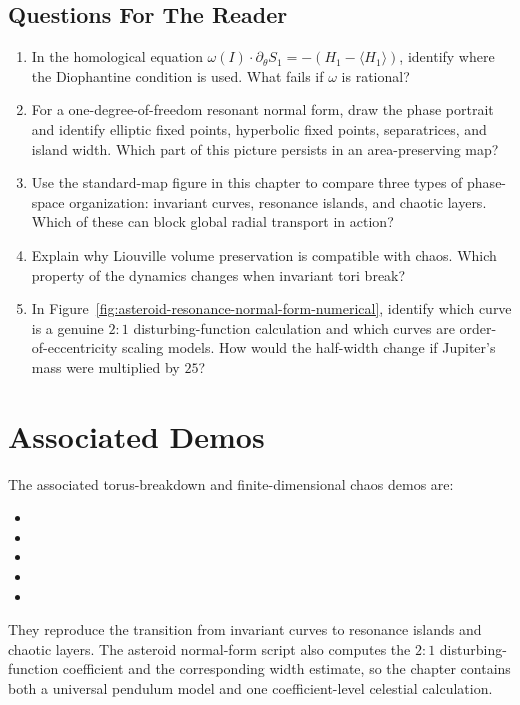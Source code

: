 \subsection{Questions For The Reader}
\label{sec:perturbation-chaos-questions}

\begin{enumerate}
\item In the homological equation
\(\omega(I)\cdot\partial_\theta S_1=-(H_1-\langle H_1\rangle)\), identify
where the Diophantine condition is used. What fails if \(\omega\) is
rational?
\item For a one-degree-of-freedom resonant normal form, draw the phase portrait
and identify elliptic fixed points, hyperbolic fixed points, separatrices, and
island width. Which part of this picture persists in an area-preserving map?
\item Use the standard-map figure in this chapter to compare three types of
phase-space organization: invariant curves, resonance islands, and chaotic
layers. Which of these can block global radial transport in action?
\item Explain why Liouville volume preservation is compatible with chaos. Which
property of the dynamics changes when invariant tori break?
\item In Figure~\ref{fig:asteroid-resonance-normal-form-numerical}, identify
which curve is a genuine \(2:1\) disturbing-function calculation and which
curves are order-of-eccentricity scaling models.  How would the half-width
change if Jupiter's mass were multiplied by \(25\)?
\end{enumerate}

\section{Associated Demos}
\label{sec:perturbation-chaos-demos}

The associated torus-breakdown and finite-dimensional chaos demos are:
\begin{itemize}
\item {}
\item {}
\item {}
\item {}
\item {}
\end{itemize}
They reproduce the transition from invariant curves to resonance islands and
chaotic layers.  The asteroid normal-form script also computes the \(2:1\)
disturbing-function coefficient and the corresponding width estimate, so the
chapter contains both a universal pendulum model and one coefficient-level
celestial calculation.
